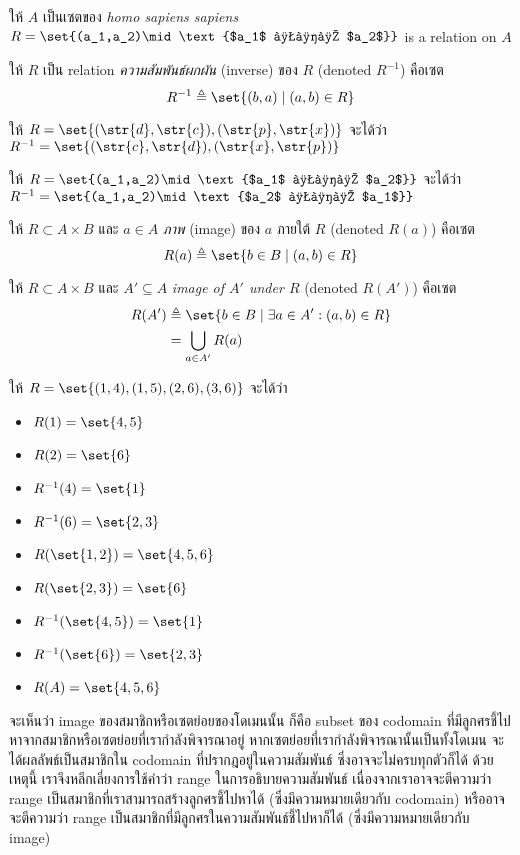 \begin{example}
ให้ $A$ เป็นเซตของ \textit{homo sapiens sapiens} \enskip $R=\set{(a_1,a_2)\mid\text{$a_1$ ชอบ $a_2$}}$ is a relation on $A$
\end{example}

\begin{definition}
ให้ $R$ เป็น relation \enskip \emph{ความสัมพันธ์ผกผัน} (inverse) ของ $R$ (denoted $R^{-1}$) คือเซต \[R^{-1}\triangleq\set{(b,a)\mid(a,b)\in R}\]
\end{definition}
%
\begin{example}
ให้ $R=\set{(\str{d},\str{c}),(\str{p},\str{x})}$ จะได้ว่า $R^{-1}=\set{(\str{c},\str{d}),(\str{x},\str{p})}$
\end{example}

\begin{example}
ให้ $R=\set{(a_1,a_2)\mid\text{$a_1$ ชอบ $a_2$}}$ จะได้ว่า $R^{-1}=\set{(a_1,a_2)\mid\text{$a_2$ ชอบ $a_1$}}$
\end{example}

\begin{definition}
ให้ $R\subset A\times B$ และ $a\in A$ \enskip \emph{ภาพ} (image) ของ $a$ ภายใต้ $R$ (denoted $R(a)$) คือเซต \[R(a)\triangleq\set{b\in B\mid (a,b)\in R}\]
\end{definition}
\begin{definition}
ให้ $R\subset A\times B$ และ $A'\subseteq A$ \enskip \emph{image of $A'$ under $R$} (denoted $R(A')$) คือเซต
\begin{align*}
R(A')&\triangleq\set{b\in B\mid\exists a\in A': (a,b)\in R} \\
&=\bigcup_{a\in A'}{R(a)}
\end{align*}
\end{definition}
%
\begin{example}
ให้ $R=\set{(1,4),(1,5),(2,6),(3,6)}$ จะได้ว่า
\begin{itemize}
\item $R(1)=\set{4,5}$
\item $R(2)=\set{6}$
\item $R^{-1}(4)=\set{1}$
\item $R^{-1}(6)=\set{2,3}$
\item $R(\set{1,2})=\set{4,5,6}$
\item $R(\set{2,3})=\set{6}$
\item $R^{-1}(\set{4,5})=\set{1}$
\item $R^{-1}(\set{6})=\set{2,3}$
\item $R(A)=\set{4,5,6}$
\end{itemize}
\end{example}
จะเห็นว่า image ของสมาชิกหรือเซตย่อยของโดเมนนั้น ก็คือ subset ของ codomain ที่มีลูกศรชี้ไปหาจากสมาชิกหรือเซตย่อยที่เรากำลังพิจารณาอยู่ \enskip หากเซตย่อยที่เรากำลังพิจารณานั้นเป็นทั้งโดเมน จะได้ผลลัพธ์เป็นสมาชิกใน codomain ที่ปรากฎอยู่ในความสัมพันธ์ ซึ่งอาจจะไม่ครบทุกตัวก็ได้ \enskip ด้วยเหตุนี้ เราจึงหลีกเลี่ยงการใช้คำว่า range ในการอธิบายความสัมพันธ์ เนื่องจากเราอาจจะตีความว่า range เป็นสมาชิกที่เราสามารถสร้างลูกศรชี้ไปหาได้ (ซึ่งมีความหมายเดียวกับ codomain) หรืออาจจะตีความว่า range เป็นสมาชิกที่มีลูกศรในความสัมพันธ์ชี้ไปหาก็ได้ (ซึ่งมีความหมายเดียวกับ image)

